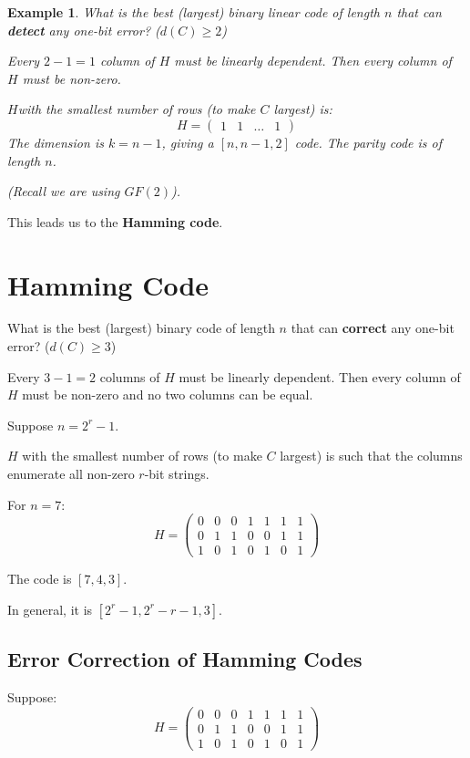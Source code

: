 \documentclass[11pt]{article}
\newtheorem{eg}{Example}
\begin{document}
\begin{eg}
  What is the best (largest) binary linear code of length $n$ that can \textbf{detect} any one-bit error? ($d(C) \geq 2$)

  Every $2 - 1 = 1$ column of $H$ must be linearly dependent.
  Then every column of $H$ must be non-zero.

  $H$with the smallest number of rows (to make $C$ largest) is:
  \[
    H = 
    \begin{pmatrix}
      1 & 1 & \dots & 1
    \end{pmatrix}
  \]
  The dimension is $k = n - 1$, giving a $[n, n - 1, 2]$ code.
  The parity code is of length $n$.

  (Recall we are using $GF(2)$).
\end{eg}

This leads us to the \textbf{Hamming code}.

\section{Hamming Code}
What is the best (largest) binary code of length $n$ that can \textbf{correct} any one-bit error? ($d(C) \geq 3$)

Every $3 - 1 = 2$ columns of $H$ must be linearly dependent.
Then every column of $H$ must be non-zero and no two columns can be equal.

Suppose $n = 2^r - 1$.

$H$ with the smallest number of rows (to make $C$ largest) is such that the columns enumerate all non-zero $r$-bit strings.

For $n = 7$:
\[
  H =
  \begin{pmatrix}
    0 & 0 & 0 & 1 & 1 & 1 & 1 \\
    0 & 1 & 1 & 0 & 0 & 1 & 1 \\
    1 & 0 & 1 & 0 & 1 & 0 & 1
  \end{pmatrix}
\]

The code is $[7, 4, 3]$.

In general, it is \textbf{$[2^r - 1, 2^r - r - 1, 3]$}.

\subsection{Error Correction of Hamming Codes}
Suppose:
\[
  H =
  \begin{pmatrix}
    0 & 0 & 0 & 1 & 1 & 1 & 1 \\
    0 & 1 & 1 & 0 & 0 & 1 & 1 \\
    1 & 0 & 1 & 0 & 1 & 0 & 1
  \end{pmatrix}
\]
\end{document}
